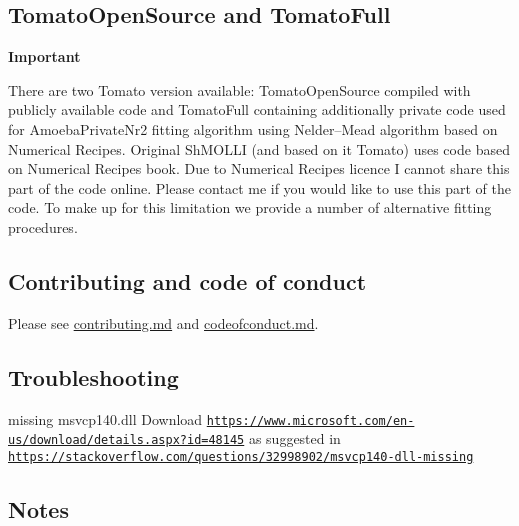 \subsection*{Tomato\-Open\-Source and Tomato\-Full}

{\bfseries Important}

There are two {\ttfamily Tomato} version available\-: {\ttfamily Tomato\-Open\-Source} compiled with publicly available code and {\ttfamily Tomato\-Full} containing additionally private code used for {\ttfamily Amoeba\-Private\-Nr2} fitting algorithm using Nelder–\-Mead algorithm based on Numerical Recipes. Original Sh\-M\-O\-L\-L\-I (and based on it Tomato) uses code based on Numerical Recipes book. Due to Numerical Recipes licence I cannot share this part of the code online. Please contact me if you would like to use this part of the code. To make up for this limitation we provide a number of alternative fitting procedures.

\subsection*{Contributing and code of conduct}

Please see \hyperlink{md_contributing}{contributing.md} and \hyperlink{md_codeofconduct}{codeofconduct.md}.

\subsection*{Troubleshooting}


\begin{DoxyItemize}
\item missing msvcp140.\-dll Download \href{https://www.microsoft.com/en-us/download/details.aspx?id=48145}{\tt https\-://www.\-microsoft.\-com/en-\/us/download/details.\-aspx?id=48145} as suggested in \href{https://stackoverflow.com/questions/32998902/msvcp140-dll-missing}{\tt https\-://stackoverflow.\-com/questions/32998902/msvcp140-\/dll-\/missing}
\end{DoxyItemize}

\subsection*{Notes}


